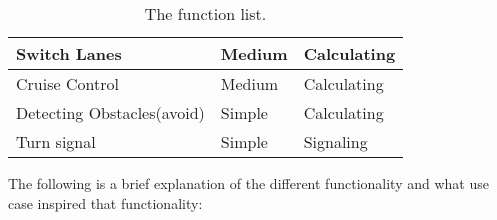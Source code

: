 \begin{table}[H]
\begin{tabular}{|l|l|l|}
Switch Lanes                                       & Medium     & Calculating  \\ \hline
Cruise Control                                     & Medium     & Calculating  \\ \hline
Detecting Obstacles(avoid)                         & Simple     & Calculating    \\ \hline
Turn signal                                        & Simple     & Signaling    \\ \hline
\end{tabular}
\caption{The function list.}
\label{functionlist}
\end{table}

The following is a brief explanation of the different functionality and what use case inspired that functionality:
